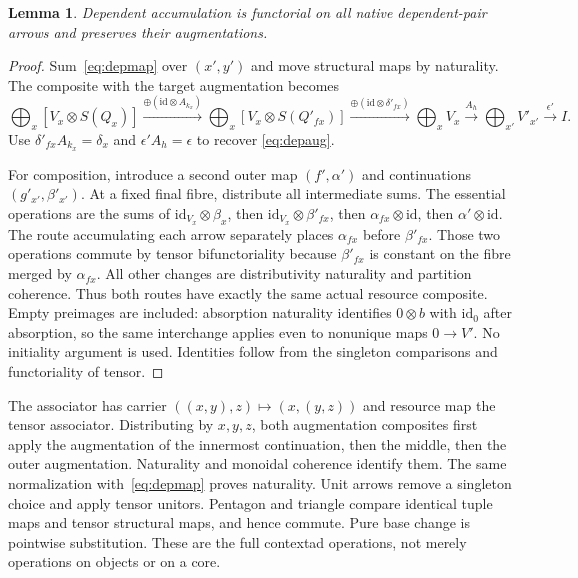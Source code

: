 \documentclass[11pt,a4paper]{article}
\newtheorem{lemma}[theorem]{Lemma}
\theoremstyle{definition}
\newcommand{\id}{\mathrm{id}}
\begin{document}
\begin{lemma}\label{lem:depfunctor}
Dependent accumulation is functorial on all native dependent-pair arrows and
preserves their augmentations.
\end{lemma}
\begin{proof}
Sum~\eqref{eq:depmap} over $(x',y')$ and move structural maps by naturality.
The composite with the target augmentation becomes
\[
 \bigoplus_x[V_x\otimes S(Q_x)]
 \xrightarrow{\oplus(\id\otimes A_{k_x})}
 \bigoplus_x[V_x\otimes S(Q'_{fx})]
 \xrightarrow{\oplus(\id\otimes\delta'_{fx})}
 \bigoplus_xV_x\xrightarrow{A_h}\bigoplus_{x'}V'_{x'}
 \xrightarrow{\epsilon'}I.
\]
Use $\delta'_{fx}A_{k_x}=\delta_x$ and $\epsilon'A_h=\epsilon$ to recover
\eqref{eq:depaug}.

For composition, introduce a second outer map $(f',\alpha')$ and
continuations $(g'_{x'},\beta'_{x'})$. At a fixed final fibre, distribute all
intermediate sums. The essential operations are the sums of
$\id_{V_x}\otimes\beta_x$, then
$\id_{V_x}\otimes\beta'_{fx}$, then $\alpha_{fx}\otimes\id$, then
$\alpha'\otimes\id$. The route accumulating each arrow separately places
$\alpha_{fx}$ before $\beta'_{fx}$. Those two operations commute by tensor
bifunctoriality because $\beta'_{fx}$ is constant on the fibre merged by
$\alpha_{fx}$. All other changes are distributivity naturality and partition
coherence. Thus both routes have exactly the same actual resource composite.
Empty preimages are included: absorption naturality identifies $0\otimes b$
with $\id_0$ after absorption, so the same interchange applies even to
nonunique maps $0\to V'$. No initiality argument is used. Identities follow
from the singleton comparisons and functoriality of tensor.
\end{proof}

The associator has carrier $((x,y),z)\mapsto(x,(y,z))$ and resource map the
tensor associator. Distributing by $x,y,z$, both augmentation composites first
apply the augmentation of the innermost continuation, then the middle, then
the outer augmentation. Naturality and monoidal coherence identify them.
The same normalization with~\eqref{eq:depmap} proves naturality. Unit arrows
remove a singleton choice and apply tensor unitors. Pentagon and triangle
compare identical tuple maps and tensor structural maps, and hence commute.
Pure base change is pointwise substitution. These are the full contextad
operations, not merely operations on objects or on a core.
\end{document}
